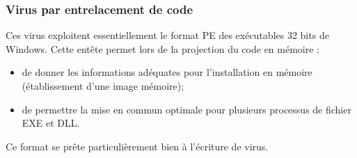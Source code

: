 \documentclass{beamer}
\begin{document}
\begin{frame}
\frametitle{Virus par  entrelacement  de code}
Ces virus exploitent essentiellement le format PE des exécutables 32 bits de Windows. Cette entête permet lors de la projection du code en mémoire :
\begin{itemize}
\item de donner les informations adéquates pour l'installation en mémoire (établissement d'une image mémoire);
\item de permettre la mise en commun optimale pour plusieurs processus de fichier EXE et DLL.
\end{itemize}
Ce format se prête particulièrement bien  à l'écriture de virus.
\end{frame}











\end{document}
